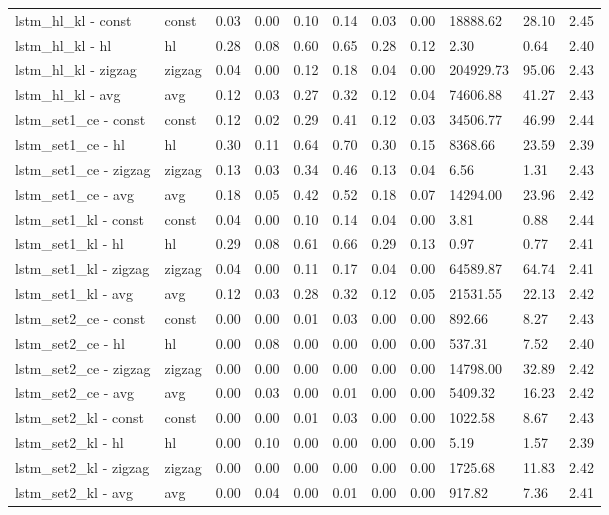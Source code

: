 \begin{longtable}{|p{1.3cm}|p{1.3cm}|p{1.3cm}|p{1.3cm}|p{1.3cm}|p{1.3cm}|p{1.3cm}|p{1.3cm}|p{1.3cm}|p{1.3cm}|p{1.3cm}|}
lstm_hl_kl - const & const & 0.03 & 0.00 & 0.10 & 0.14 & 0.03 & 0.00 & 18888.62 & 28.10 & 2.45 \\
lstm_hl_kl - hl & hl & 0.28 & 0.08 & 0.60 & 0.65 & 0.28 & 0.12 & 2.30 & 0.64 & 2.40 \\
lstm_hl_kl - zigzag & zigzag & 0.04 & 0.00 & 0.12 & 0.18 & 0.04 & 0.00 & 204929.73 & 95.06 & 2.43 \\
lstm_hl_kl - avg & avg & 0.12 & 0.03 & 0.27 & 0.32 & 0.12 & 0.04 & 74606.88 & 41.27 & 2.43 \\
lstm_set1_ce - const & const & 0.12 & 0.02 & 0.29 & 0.41 & 0.12 & 0.03 & 34506.77 & 46.99 & 2.44 \\
lstm_set1_ce - hl & hl & 0.30 & 0.11 & 0.64 & 0.70 & 0.30 & 0.15 & 8368.66 & 23.59 & 2.39 \\
lstm_set1_ce - zigzag & zigzag & 0.13 & 0.03 & 0.34 & 0.46 & 0.13 & 0.04 & 6.56 & 1.31 & 2.43 \\
lstm_set1_ce - avg & avg & 0.18 & 0.05 & 0.42 & 0.52 & 0.18 & 0.07 & 14294.00 & 23.96 & 2.42 \\
lstm_set1_kl - const & const & 0.04 & 0.00 & 0.10 & 0.14 & 0.04 & 0.00 & 3.81 & 0.88 & 2.44 \\
lstm_set1_kl - hl & hl & 0.29 & 0.08 & 0.61 & 0.66 & 0.29 & 0.13 & 0.97 & 0.77 & 2.41 \\
lstm_set1_kl - zigzag & zigzag & 0.04 & 0.00 & 0.11 & 0.17 & 0.04 & 0.00 & 64589.87 & 64.74 & 2.41 \\
lstm_set1_kl - avg & avg & 0.12 & 0.03 & 0.28 & 0.32 & 0.12 & 0.05 & 21531.55 & 22.13 & 2.42 \\
lstm_set2_ce - const & const & 0.00 & 0.00 & 0.01 & 0.03 & 0.00 & 0.00 & 892.66 & 8.27 & 2.43 \\
lstm_set2_ce - hl & hl & 0.00 & 0.08 & 0.00 & 0.00 & 0.00 & 0.00 & 537.31 & 7.52 & 2.40 \\
lstm_set2_ce - zigzag & zigzag & 0.00 & 0.00 & 0.00 & 0.00 & 0.00 & 0.00 & 14798.00 & 32.89 & 2.42 \\
lstm_set2_ce - avg & avg & 0.00 & 0.03 & 0.00 & 0.01 & 0.00 & 0.00 & 5409.32 & 16.23 & 2.42 \\
lstm_set2_kl - const & const & 0.00 & 0.00 & 0.01 & 0.03 & 0.00 & 0.00 & 1022.58 & 8.67 & 2.43 \\
lstm_set2_kl - hl & hl & 0.00 & 0.10 & 0.00 & 0.00 & 0.00 & 0.00 & 5.19 & 1.57 & 2.39 \\
lstm_set2_kl - zigzag & zigzag & 0.00 & 0.00 & 0.00 & 0.00 & 0.00 & 0.00 & 1725.68 & 11.83 & 2.42 \\
lstm_set2_kl - avg & avg & 0.00 & 0.04 & 0.00 & 0.01 & 0.00 & 0.00 & 917.82 & 7.36 & 2.41 \\

\end{longtable}
